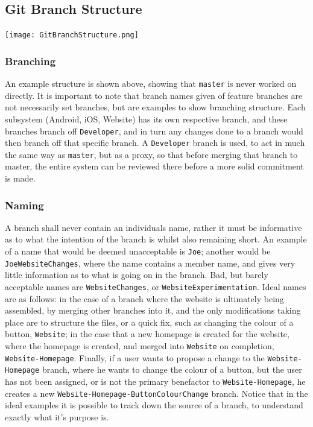 \documentclass[12pt]{article}
\begin{document}
  \center\subsection{Git Branch Structure}
  \texttt{[image: GitBranchStructure.png]}
  
\flushleft\subsubsection{Branching}
  An example structure is shown above, showing that \texttt{master} is never worked on directly. It is important to note that branch names given of feature branches are not necessarily set branches, but are examples to show branching structure. Each subsystem (Android, iOS, Website) has its own respective branch, and these branches branch off \texttt{Developer}, and in turn any changes done to a branch would then branch off that specific branch. 
  A \texttt{Developer} branch is used, to act in much the same way as \texttt{master}, but as a proxy, so that before merging that branch to master, the entire system can be reviewed there before a more solid commitment is made.
  \subsubsection{Naming}
  \flushleft
  A branch shall never contain an individuals name, rather it must be informative as to what the intention of the branch is whilst also remaining short. An example of a  name that would be deemed unacceptable is \texttt{Joe}; another would be \texttt{JoeWebsiteChanges}, where the name contains a member name, and gives very little information as to what is going on in the branch. Bad, but barely acceptable names are \texttt{WebsiteChanges}, or \texttt{WebsiteExperimentation}. Ideal names are as follows: in the case of a branch where the website is ultimately being assembled, by merging other branches into it, and the only modifications taking place are to structure the files, or a quick fix, such as changing the colour of a button, \texttt{Website}; in the case that a new homepage is created for the website, where the homepage is created, and merged into \texttt{Website} on completion, \texttt{Website-Homepage}. Finally, if a user wants to propose a change to the \texttt{Website-Homepage} branch, where he wants to change the colour of a button, but the user has not been assigned, or is not the primary benefactor to \texttt{Website-Homepage}, he creates a new \texttt{Website-Homepage-ButtonColourChange} branch. Notice that in the ideal examples it is possible to track down the source of a branch, to understand exactly what it's purpose is.
  
\end{document}
